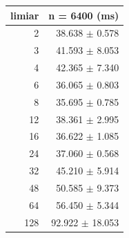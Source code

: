 \begin{tabular}{rr}
\hline
limiar & n = 6400 (ms) \\
\hline
2 & 38.638 $\pm$ 0.578 \\
3 & 41.593 $\pm$ 8.053 \\
4 & 42.365 $\pm$ 7.340 \\
6 & 36.065 $\pm$ 0.803 \\
8 & 35.695 $\pm$ 0.785 \\
12 & 38.361 $\pm$ 2.995 \\
16 & 36.622 $\pm$ 1.085 \\
24 & 37.060 $\pm$ 0.568 \\
32 & 45.210 $\pm$ 5.914 \\
48 & 50.585 $\pm$ 9.373 \\
64 & 56.450 $\pm$ 5.344 \\
128 & 92.922 $\pm$ 18.053 \\
\hline
\end{tabular}
